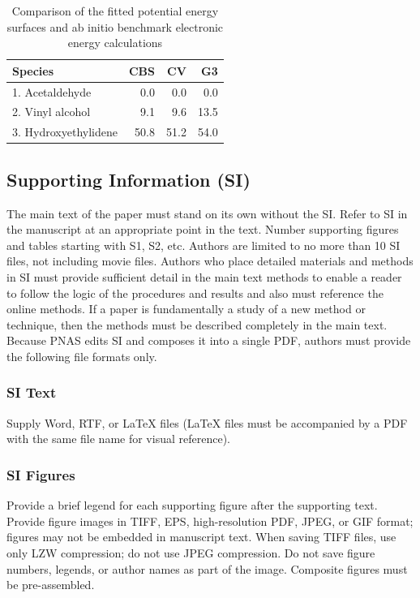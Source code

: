 \documentclass[9pt,twocolumn,twoside,lineno]{pnas-new}
\begin{document}
\begin{table}%
\centering
\caption{Comparison of the fitted potential energy surfaces and ab initio benchmark electronic energy calculations}
\begin{tabular}{lrrr}
Species & CBS & CV & G3 \\
\midrule
1. Acetaldehyde & 0.0 & 0.0 & 0.0 \\
2. Vinyl alcohol & 9.1 & 9.6 & 13.5 \\
3. Hydroxyethylidene & 50.8 & 51.2 & 54.0\\
\bottomrule
\end{tabular}

\end{table}

\subsection*{Supporting Information (SI)}

The main text of the paper must stand on its own without the SI. Refer to SI in the manuscript at an appropriate point in the text. Number supporting figures and tables starting with S1, S2, etc. Authors are limited to no more than 10 SI files, not including movie files. Authors who place detailed materials and methods in SI must provide sufficient detail in the main text methods to enable a reader to follow the logic of the procedures and results and also must reference the online methods. If a paper is fundamentally a study of a new method or technique, then the methods must be described completely in the main text. Because PNAS edits SI and composes it into a single PDF, authors must provide the following file formats only.

\subsubsection*{SI Text}

Supply Word, RTF, or LaTeX files (LaTeX files must be accompanied by a PDF with the same file name for visual reference).

\subsubsection*{SI Figures}

Provide a brief legend for each supporting figure after the supporting text. Provide figure images in TIFF, EPS, high-resolution PDF, JPEG, or GIF format; figures may not be embedded in manuscript text. When saving TIFF files, use only LZW compression; do not use JPEG compression. Do not save figure numbers, legends, or author names as part of the image. Composite figures must be pre-assembled.
\end{document}
